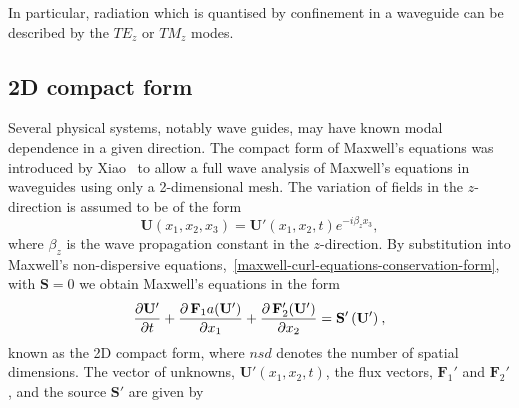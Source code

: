 In particular, radiation which is quantised by confinement in a waveguide can be described by the $TE_z$ or $TM_z$ modes.

\subsection{2D compact form}

Several physical systems, notably wave guides, may have known modal dependence in a given direction. The compact form of Maxwell's equations was introduced by Xiao~\cite{Xiao:1992be} to allow a full wave analysis of Maxwell's equations in waveguides using only a 2-dimensional mesh. The variation of fields in the $z$-direction is assumed to be of the form
\begin{equation}
    \mathbf{U}(x_1,x_2,x_3) = \mathbf{U}'(x_1, x_2,t) e^{-i \beta_z x_3},
\label{compact2D-zdep}
\end{equation}
where $\beta_z$ is the wave propagation constant in the $z$-direction. By substitution into Maxwell's non-dispersive equations,~\eqref{maxwell-curl-equations-conservation-form}, with $\mathbf{S} = 0$ we obtain Maxwell's equations in the form
\begin{equation}
\frac{\partial  \mathbf{U}'}{\partial t}+ 
\frac { \partial \, \mathbf{F}_1a(\mathbf{U}') }{ \partial x_1 } +
\frac { \partial \, \mathbf{F}_2'(\mathbf{U}') }{ \partial x_2 } =
\mathbf{S}'\,(\mathbf{U}') \: ,
\end{equation}
known as the 2D compact form, where $nsd$ denotes the number of spatial dimensions. The vector of unknowns, $\mathbf{U}'(x_1,x_2,t)$, the flux vectors, $\mathbf{F}_1'$ and $\mathbf{F}_2'$, and the source $\mathbf{S}'$ are given by
